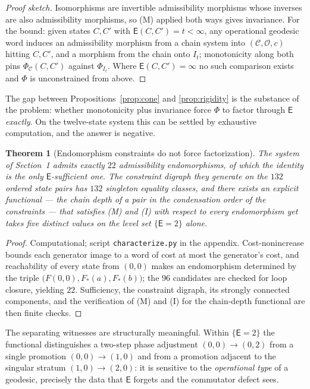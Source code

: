 \documentclass[11pt]{article}
\newtheorem{theorem}{Theorem}[section]
\theoremstyle{remark}
\newcommand{\C}{\mathcal{C}}
\newcommand{\Ops}{\mathcal{O}}
\newcommand{\E}{\mathsf{E}}
\begin{document}
\begin{proof}[Proof sketch]
Isomorphisms are invertible admissibility morphisms whose inverses
are also admissibility morphisms, so (M) applied both ways gives
invariance. For the bound: given states $C,C'$ with
$\E(C,C')=t<\infty$, any operational geodesic word induces an
admissibility morphism from a chain system into $(\C,\Ops,c)$ hitting
$C,C'$, and a morphism from the chain onto $I_t$; monotonicity along
both pins $\Phi_{\C}(C,C')$ against $\Phi_{I_t}$. Where
$\E(C,C')=\infty$ no such comparison exists and $\Phi$ is
unconstrained from above.
\end{proof}

The gap between Propositions~\ref{prop:cone} and \ref{prop:rigidity}
is the substance of the problem: whether monotonicity plus invariance
force $\Phi$ to factor through $\E$ \emph{exactly}. On the
twelve-state system this can be settled by exhaustive computation, and
the answer is negative.

\begin{theorem}[Endomorphism constraints do not force factorization]
\label{thm:nofactor}
The system of Section~1 admits exactly $22$ admissibility
endomorphisms, of which the identity is the only $\E$-sufficient one.
The constraint digraph they generate on the $132$ ordered state pairs
has $132$ singleton equality classes, and there exists an explicit
functional --- the chain depth of a pair in the condensation order of
the constraints --- that satisfies (M) and (I) with respect to every
endomorphism yet takes five distinct values on the level set
$\{\E=2\}$ alone.
\end{theorem}

\begin{proof}
Computational; script \texttt{characterize.py} in the appendix.
Cost-nonincrease bounds each generator image to a word of cost at
most the generator's cost, and reachability of every state from
$(0,0)$ makes an endomorphism determined by the triple
$\bigl(F(0,0),F_{*}(a),F_{*}(b)\bigr)$; the $96$ candidates are
checked for loop closure, yielding $22$. Sufficiency, the constraint
digraph, its strongly connected components, and the verification of
(M) and (I) for the chain-depth functional are then finite checks.
\end{proof}

The separating witnesses are structurally meaningful. Within
$\{\E=2\}$ the functional distinguishes a two-step phase adjustment
$(0,0)\to(0,2)$ from a single promotion $(0,0)\to(1,0)$ and from a
promotion adjacent to the singular stratum $(1,0)\to(2,0)$: it is
sensitive to the \emph{operational type} of a geodesic, precisely the
data that $\E$ forgets and the commutator defect sees.
\end{document}
